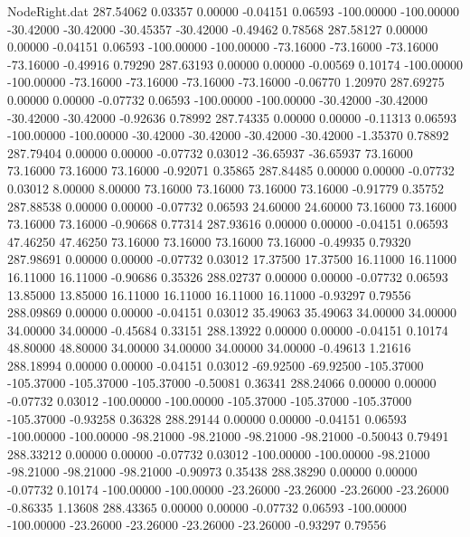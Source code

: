 \begin{filecontents}{NodeRight.dat}
 287.54062    0.03357    0.00000    -0.04151    0.06593 -100.00000 -100.00000  -30.42000  -30.42000  -30.45357  -30.42000   -0.49462    0.78568
 287.58127    0.00000    0.00000    -0.04151    0.06593 -100.00000 -100.00000  -73.16000  -73.16000  -73.16000  -73.16000   -0.49916    0.79290
 287.63193    0.00000    0.00000    -0.00569    0.10174 -100.00000 -100.00000  -73.16000  -73.16000  -73.16000  -73.16000   -0.06770    1.20970
 287.69275    0.00000    0.00000    -0.07732    0.06593 -100.00000 -100.00000  -30.42000  -30.42000  -30.42000  -30.42000   -0.92636    0.78992
 287.74335    0.00000    0.00000    -0.11313    0.06593 -100.00000 -100.00000  -30.42000  -30.42000  -30.42000  -30.42000   -1.35370    0.78892
 287.79404    0.00000    0.00000    -0.07732    0.03012  -36.65937  -36.65937   73.16000   73.16000   73.16000   73.16000   -0.92071    0.35865
 287.84485    0.00000    0.00000    -0.07732    0.03012    8.00000    8.00000   73.16000   73.16000   73.16000   73.16000   -0.91779    0.35752
 287.88538    0.00000    0.00000    -0.07732    0.06593   24.60000   24.60000   73.16000   73.16000   73.16000   73.16000   -0.90668    0.77314
 287.93616    0.00000    0.00000    -0.04151    0.06593   47.46250   47.46250   73.16000   73.16000   73.16000   73.16000   -0.49935    0.79320
 287.98691    0.00000    0.00000    -0.07732    0.03012   17.37500   17.37500   16.11000   16.11000   16.11000   16.11000   -0.90686    0.35326
 288.02737    0.00000    0.00000    -0.07732    0.06593   13.85000   13.85000   16.11000   16.11000   16.11000   16.11000   -0.93297    0.79556
 288.09869    0.00000    0.00000    -0.04151    0.03012   35.49063   35.49063   34.00000   34.00000   34.00000   34.00000   -0.45684    0.33151
 288.13922    0.00000    0.00000    -0.04151    0.10174   48.80000   48.80000   34.00000   34.00000   34.00000   34.00000   -0.49613    1.21616
 288.18994    0.00000    0.00000    -0.04151    0.03012  -69.92500  -69.92500 -105.37000 -105.37000 -105.37000 -105.37000   -0.50081    0.36341
 288.24066    0.00000    0.00000    -0.07732    0.03012 -100.00000 -100.00000 -105.37000 -105.37000 -105.37000 -105.37000   -0.93258    0.36328
 288.29144    0.00000    0.00000    -0.04151    0.06593 -100.00000 -100.00000  -98.21000  -98.21000  -98.21000  -98.21000   -0.50043    0.79491
 288.33212    0.00000    0.00000    -0.07732    0.03012 -100.00000 -100.00000  -98.21000  -98.21000  -98.21000  -98.21000   -0.90973    0.35438
 288.38290    0.00000    0.00000    -0.07732    0.10174 -100.00000 -100.00000  -23.26000  -23.26000  -23.26000  -23.26000   -0.86335    1.13608
 288.43365    0.00000    0.00000    -0.07732    0.06593 -100.00000 -100.00000  -23.26000  -23.26000  -23.26000  -23.26000   -0.93297    0.79556

\end{filecontents}
